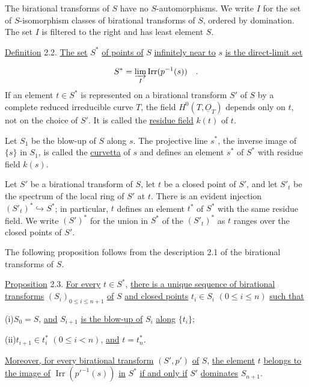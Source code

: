 The birational transforms of $S$ have no $S$-automorphisms.  We write $I$ for the
set of $S$-isomorphism classes of birational transforms of $S$, ordered by
domination.  The set $I$ is filtered to the right and has least element $S$.

\underline{Definition} 2.2. \underline{The set} $S^*$ \underline{of points of}
$S$ \underline{infinitely near to} $s$ \underline{is the direct-limit set}

\begin{equation*}
S^*=\varinjlim_I\operatorname{Irr}(p^{-1}(s)) \quad .
\end{equation*}
If an element $t\in S^*$ is represented on a birational transform $S'$ of $S$ by
a complete reduced irreducible curve $T$, the field
$H^0(T,\underline{O}_T)$ depends only on $t$, not on the choice of $S'$.  It is
called the \underline{residue field} $k(t)$ of $t$.

Let $S_1$ be the blow-up of $S$ along $s$.  The projective line $s^*$, the inverse
image of $\{s\}$ in $S_1$, is called the \underline{curvetta} of $s$ and defines
an element $s^*$ of $S^*$ with residue field $k(s)$.

Let $S'$ be a birational transform of $S$, let $t$ be a closed point of $S'$, and
let $S'_t$ be the spectrum of the local ring of $S'$ at $t$.  There is an evident
injection $(S'_t)^*\hookrightarrow S^*$; in particular, $t$ defines an element
$t^*$ of $S^*$ with the same residue field.  We write $(S')^*$ for the union in
$S^*$ of the $(S'_t)^*$ as $t$ ranges over the closed points of $S'$.

The following proposition follows from the description 2.1 of the birational
transforms of $S$.


\underline{Proposition} 2.3. \underline{For every} $t\in S^*$,
\underline{there is a unique sequence of birational transforms}
$(S_i)_{0\leq i\leq n+1}$ \underline{of} $S$ \underline{and closed points}
$t_i\in S_i$ $(0\leq i\leq n)$ \underline{such that}

(i)\quad $S_0=S$, \underline{and} $S_{i+1}$ \underline{is the blow-up of} $S_i$
\underline{along} $\{t_i\}$;

(ii)\quad $t_{i+1}\in t_i^*$ $(0\leq i<n)$, \underline{and} $t=t_n^*$.

\underline{Moreover, for every birational transform} $(S',p')$ \underline{of}
$S$, \underline{the element} $t$ \underline{belongs to the image of}
$\operatorname{Irr}(p'^{-1}(s))$ \underline{in} $S^*$ \underline{if and only if}
$S'$ \underline{dominates} $S_{n+1}$.

